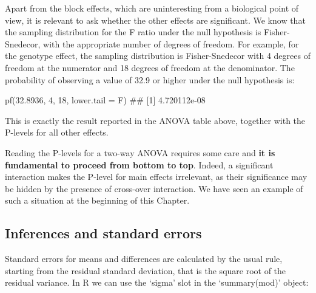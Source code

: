 \documentclass[a4paper,12pt,oneside]{book}
\newenvironment{Shaded}{\begin{snugshade}}{\end{snugshade}}
\newcommand{\DecValTok}[1]{#1}
\newcommand{\FloatTok}[1]{#1}
\newcommand{\SpecialCharTok}[1]{#1}
\newcommand{\DocumentationTok}[1]{#1}
\newcommand{\OtherTok}[1]{#1}
\newcommand{\FunctionTok}[1]{#1}
\newcommand{\AttributeTok}[1]{#1}
\newcommand{\NormalTok}[1]{#1}
\begin{document}
Apart from the block effects, which are uninteresting from a biological point of view, it is relevant to ask whether the other effects are significant. We know that the sampling distribution for the F ratio under the null hypothesis is Fisher-Snedecor, with the appropriate number of degrees of freedom. For example, for the genotype effect, the sampling distribution is Fisher-Snedecor with 4 degrees of freedom at the numerator and 18 degrees of freedom at the denominator. The probability of observing a value of 32.9 or higher under the null hypothesis is:

\vspace{12pt}

\begin{Shaded}
\begin{Highlighting}[]
\FunctionTok{pf}\NormalTok{(}\FloatTok{32.8936}\NormalTok{, }\DecValTok{4}\NormalTok{, }\DecValTok{18}\NormalTok{, }\AttributeTok{lower.tail =}\NormalTok{ F)}
\DocumentationTok{\#\# [1] 4.720112e{-}08}
\end{Highlighting}
\end{Shaded}

This is exactly the result reported in the ANOVA table above, together with the P-levels for all other effects.

Reading the P-levels for a two-way ANOVA requires some care and \textbf{it is fundamental to proceed from bottom to top}. Indeed, a significant interaction makes the P-level for main effects irrelevant, as their significance may be hidden by the presence of cross-over interaction. We have seen an example of such a situation at the beginning of this Chapter.

\hypertarget{inferences-and-standard-errors}{%
\subsection{Inferences and standard errors}\label{inferences-and-standard-errors}}

Standard errors for means and differences are calculated by the usual rule, starting from the residual standard deviation, that is the square root of the residual variance. In R we can use the `sigma' slot in the `summary(mod)' object:

\vspace{12pt}

\begin{Shaded}
\end{Shaded}
\end{document}
